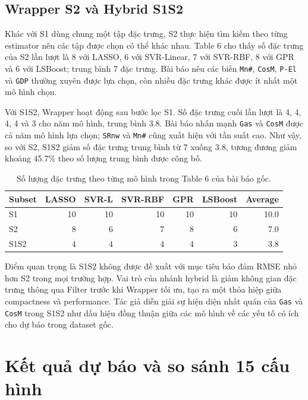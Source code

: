 \subsection{Wrapper S2 và Hybrid S1S2}

Khác với S1 dùng chung một tập đặc trưng, S2 thực hiện tìm kiếm theo từng estimator nên các tập được chọn có thể khác nhau. Table 6 cho thấy số đặc trưng của S2 lần lượt là 8 với LASSO, 6 với SVR-Linear, 7 với SVR-RBF, 8 với GPR và 6 với LSBoost; trung bình 7 đặc trưng. Bài báo nêu các biến \texttt{Mn\#}, \texttt{CosM}, \texttt{P-El} và \texttt{GDP} thường xuyên được lựa chọn, còn nhiều đặc trưng khác được ít nhất một mô hình chọn.

Với S1S2, Wrapper hoạt động sau bước lọc S1. Số đặc trưng cuối lần lượt là 4, 4, 4, 4 và 3 cho năm mô hình, trung bình 3.8. Bài báo nhấn mạnh \texttt{Gas} và \texttt{CosM} được cả năm mô hình lựa chọn; \texttt{SRnw} và \texttt{Mn\#} cũng xuất hiện với tần suất cao. Như vậy, so với S2, S1S2 giảm số đặc trưng trung bình từ 7 xuống 3.8, tương đương giảm khoảng 45.7\% theo số lượng trung bình được công bố.

\begin{table}[H]
\centering
\small
\caption{Số lượng đặc trưng theo từng mô hình trong Table 6 của bài báo gốc.}
\label{tab:authors-feature-counts}
\begin{tabular}{lrrrrrr}
\toprule
\textbf{Subset} & \textbf{LASSO} & \textbf{SVR-L} & \textbf{SVR-RBF} & \textbf{GPR} & \textbf{LSBoost} & \textbf{Average} \\
\midrule
S1 & 10 & 10 & 10 & 10 & 10 & 10.0 \\
S2 & 8 & 6 & 7 & 8 & 6 & 7.0 \\
S1S2 & 4 & 4 & 4 & 4 & 3 & 3.8 \\
\bottomrule
\end{tabular}
\end{table}

Điểm quan trọng là S1S2 không được đề xuất với mục tiêu bảo đảm RMSE nhỏ hơn S2 trong mọi trường hợp. Vai trò của nhánh hybrid là giảm không gian đặc trưng thông qua Filter trước khi Wrapper tối ưu, tạo ra một thỏa hiệp giữa compactness và performance. Tác giả diễn giải sự hiện diện nhất quán của \texttt{Gas} và \texttt{CosM} trong S1S2 như dấu hiệu đồng thuận giữa các mô hình về các yếu tố có ích cho dự báo trong dataset gốc.

\section{Kết quả dự báo và so sánh 15 cấu hình}

